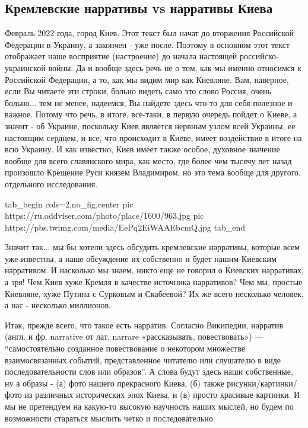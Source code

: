  
 
 
 
 

\subsection{Кремлевские нарративы vs нарративы Киева}

Февраль 2022 года, город Киев. Этот текст был начат до вторжения Российской
Федерации в Украину, а закончен - уже после. Поэтому в основном этот текст
отображает наше восприятие (настроение) до начала настоящей
российско-украинской войны. Да и вообще здесь речь не о том, как мы именно
относимся к Российской Федерации, а то, как мы видим мир как Киевляне. Вам,
наверное, если Вы читаете эти строки, больно видеть само это слово Россия,
очень больно... тем не менее, надеемся, Вы найдете здесь что-то для себя
полезное и важное. Потому что речь, в итоге, все-таки, в первую очередь пойдет
о Киеве, а значит - об Украине, поскольку Киев является нервным узлом всей
Украины, ее настоящим сердцем, и все, что происходит в Киеве, имеет воздействие
в итоге на всю Украину. И как известно, Киев имеет также особое, духовное
значение вообще для всего славянского мира, как место, где более чем тысячу лет
назад произошло Крещение Руси князем Владимиром, но это тема вообще для
другого, отдельного исследования.

\ifcmt
  tab_begin cols=2,no_fig,center
     pic https://ru.oddviser.com/photo/place/1600/963.jpg
		 pic https://pbs.twimg.com/media/EePq2EiWAAEbcmQ.jpg
  tab_end
\fi

Значит так... мы бы хотели здесь обсудить кремлевские нарративы, которые всем
уже известны, а наше обсуждение их собственно и будет нашим Киевским
нарративом.  И насколько мы знаем, никто еще не говорил о Киевских нарративах,
а зря! Чем Киев хуже Кремля в качестве источника нарративов? Чем мы, простые
Киевляне, хуже Путина с Сурковым и Скабеевой? Их же всего несколько человек, а
нас - несколько миллионов.

Итак, прежде всего, что такое есть нарратив. Согласно Википедии, нарратив
(англ. и фр. narrative от лат. narrare «рассказывать, повествовать») —
\enquote{самостоятельно созданное повествование о некотором множестве
взаимосвязанных событий, представленное читателю или слушателю в виде
последовательности слов или образов}. А слова будут здесь наши собственные, ну
а образы - (а) фото нашего прекрасного Киева, (б) также рисунки/картинки/фото
из различных исторических эпох Киева, и (в) просто красивые картинки. И мы не
претендуем на какую-то высокую научность наших мыслей, но будем по возможности
стараться мыслить четко и последовательно.

